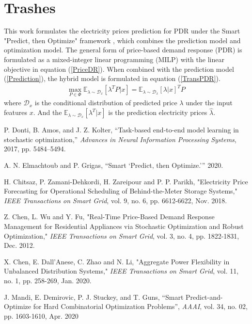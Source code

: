 \documentclass[journal]{IEEEtran}
\begin{document}
\section*{Trashes}
This work formulates the electricity prices prediction for PDR under the Smart "Predict, then Optimize" framework \cite{Elmachtoub2020}, which combines the prediction model and optimization model. The general form of price-based demand response (PDR) is formulated as a mixed-integer linear programming (MILP) with the linear objective in equation (\ref{PriceDR}). When combined with the prediction model (\ref{Prediction}), the hybrid model is formulated in equation (\ref{TransPDR}).
\begin{equation}
  \label{TransPDR}
  \begin{aligned}
    \max_{P \in \Phi} \mathbb{E}_{ \lambda \sim \mathcal{D}_x} [\lambda^T P | x] = \mathbb{E}_{\lambda \sim \mathcal{D}_x} [\lambda | x]^T P
  \end{aligned}
\end{equation}
where $\mathcal{D}_x$ is the conditional distribution of predicted price $\lambda$ under the input features $x$. And the $\mathbb{E}_{\lambda \sim \mathcal{D}_x} [\lambda^T | x]$ is the prediction electricity prices $\hat{\lambda}$.

\ifCLASSOPTIONcaptionsoff
  \newpage
\fi



\begin{thebibliography}{2}

P. Donti, B. Amos, and J. Z. Kolter, “Task-based end-to-end model learning in stochastic optimization,” \emph{Advances in Neural Information Processing Systems}, 2017, pp. 5484–5494.

A. N. Elmachtoub and P. Grigas, “Smart ‘Predict, then Optimize.’” 2020.

H. Chitsaz, P. Zamani-Dehkordi, H. Zareipour and P. P. Parikh, "Electricity Price Forecasting for Operational Scheduling of Behind-the-Meter Storage Systems," \emph{IEEE Transactions on Smart Grid}, vol. 9, no. 6, pp. 6612-6622, Nov. 2018.

Z. Chen, L. Wu and Y. Fu, "Real-Time Price-Based Demand Response Management for Residential Appliances via Stochastic Optimization and Robust Optimization," \emph{IEEE Transactions on Smart Grid}, vol. 3, no. 4, pp. 1822-1831, Dec. 2012.

X. Chen, E. Dall’Anese, C. Zhao and N. Li, "Aggregate Power Flexibility in Unbalanced Distribution Systems," \emph{IEEE Transactions on Smart Grid}, vol. 11, no. 1, pp. 258-269, Jan. 2020.

J. Mandi, E. Demirovic, P. J. Stuckey, and T. Guns, “Smart Predict-and-Optimize for Hard Combinatorial Optimization Problems”, \emph{AAAI}, vol. 34, no. 02, pp. 1603-1610, Apr. 2020

\end{thebibliography}
\end{document}
